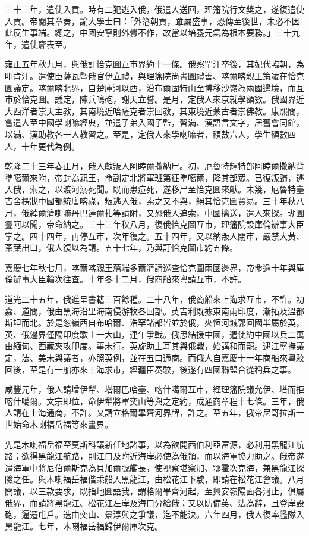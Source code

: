 \begin{pinyinscope}
三十三年，遣使入貢。時有二犯逃入俄，俄遣人送回，理籓院行文獎之，遂復遣使入貢。帝閱其章奏，諭大學士曰：「外籓朝貢，雖屬盛事，恐傳至後世，未必不因此反生事端。總之，中國安寧則外釁不作，故當以培養元氣為根本要務。」三十九年，遣使齎表至。

雍正五年秋九月，與俄訂恰克圖互市界約十一條。俄察罕汗卒後，其妃代臨朝，為叩肯汗。遣使臣薩瓦暨俄官伊立禮，與理籓院尚書圖禮善、喀爾喀親王策凌在恰克圖議定。喀爾喀北界，自楚庫河以西，沿布爾固特山至博移沙嶺為兩國邊境，而互市於恰克圖。議定，陳兵鳴砲，謝天立誓。是月，定俄人來京就學額數。俄國界近大西洋者崇天主教，其南境近哈薩克者崇回教，其東境近蒙古者崇佛教。康熙間，嘗遣人至中國學喇嘛經典，並遣子弟入國子監，習滿、漢語言文字，居舊會同館，以滿、漢助教各一人教習之。至是，定俄人來學喇嘛者，額數六人，學生額數四人，十年更代為例。

乾隆二十三年春正月，俄人獻叛人阿睦爾撒納尸。初，厄魯特輝特部阿睦爾撒納背準噶爾來附，帝封為親王，命副定北將軍班第征準噶爾，降其部眾。已復叛歸，逃入俄，索之，以渡河溺死聞。既而患痘死，遂移尸至恰克圖來獻。未幾，厄魯特臺吉舍楞戕中國都統唐喀祿，叛逃入俄，索之又不與，絕其恰克圖貿易。三十年秋八月，俄綽爾濟喇嘛丹巴達爾扎等請附，又恐俄人追索，中國擒送，遣人來探。瑚圖靈阿以聞，帝命納之。三十三年秋八月，復俄恰克圖互市，理籓院設庫倫辦事大臣掌之。四十四年，再停互市，次年復之。五十四年，又以納叛人閉市，嚴禁大黃、茶葉出口，俄人復以為請。五十七年，乃與訂恰克圖市約五條。

嘉慶七年秋七月，喀爾喀親王蘊端多爾濟請巡查恰克圖兩國邊界，帝命逾十年與庫倫辦事大臣輪次往查。十年冬十二月，俄商船來粵請互市，不許。

道光二十五年，俄進呈書籍三百餘種。二十八年，俄商船來上海求互市，不許。初嘉、道間，俄由黑海沿里海南侵游牧各回部。英吉利既據東南兩印度，漸拓及溫都斯坦而北。於是怱嶺西自布哈爾、浩罕諸部皆並於俄，夾恆河城郭回國半屬於英，英、俄邊界僅隔印度歌士一大山，連年爭戰。俄思結援中國，遣使約中國以兵二萬由緬甸、西藏夾攻印度。事未行。英旋助土耳其與俄戰，始講和而罷。逮江寧撫議定，法、美未與議者，亦照英例，並在五口通商。而俄人自嘉慶十一年商船來粵駮回後，至是有一船亦來上海求市，經疆臣奏駮，後遂有四國聯盟合從稱兵之事。

咸豐元年，俄人請增伊犁、塔爾巴哈臺、喀什噶爾互市，經理籓院議允伊、塔而拒喀什噶爾。文宗即位，命伊犁將軍奕山等與之定約，成通商章程十七條。三年，俄人請在上海通商，不許。又請立格爾畢齊河界牌，許之。至五年，俄帝尼哥拉斯一世始命木喇福岳福等來畫界。

先是木喇福岳福至莫斯科議新任地諸事，以為欲開西伯利亞富源，必利用黑龍江航路；欲得黑龍江航路，則江口及附近海岸必使為俄領，而以海軍協力助之。俄帝遂遣海軍中將尼伯爾斯克為貝加爾號艦長，使視察堪察加、鄂霍次克海，兼黑龍江探險之任。與木喇福岳福偕乘船入黑龍江，由松花江下駛，即請在松花江會議。八月開議，以三款要求，既指地圖語我，謂格爾畢齊河起，至興安嶺陽面各河止，俱屬俄界，而請將黑龍江、松花江左岸及海口分給俄；又以防備英、法為辭，且登岸設砲，逼遷屯戶。迭由奕山、景淳與之爭議，迄不能決。六年四月，俄人復率艦隊入黑龍江。七年，木喇福岳福歸伊爾庫次克。


\end{pinyinscope}
